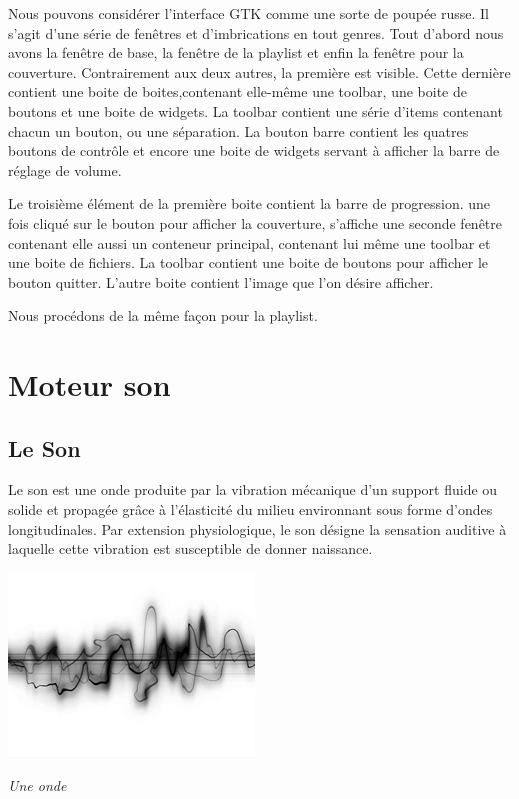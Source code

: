 \documentclass[12pt,a4paper]{report}
\begin{document}
Nous pouvons considérer l'interface GTK comme une sorte de poupée russe. Il s'agit d'une série de fenêtres et d'imbrications en tout genres.
Tout d'abord nous avons la fenêtre de base, la fenêtre de la playlist et enfin la fenêtre pour la couverture. Contrairement aux deux autres, la première est visible.
Cette dernière contient une boite de boites,contenant elle-même une toolbar, une boite de boutons et une boite de widgets. La toolbar contient une série d'items contenant chacun un bouton, ou une séparation.
La bouton barre contient les quatres boutons de contrôle et encore une boite de widgets servant à afficher la barre de réglage de volume.

Le troisième élément de la première boite contient la barre de progression.
une fois cliqué sur le bouton pour afficher la couverture, s'affiche une seconde fenêtre contenant elle aussi un conteneur principal, contenant lui même une toolbar et une boite de fichiers. La toolbar contient une boite de boutons pour afficher le bouton quitter. L'autre boite contient l'image que l'on désire afficher.

Nous procédons de la même façon pour la playlist.


\chapter{Moteur son}
\section{Le Son}


Le son est une onde produite par la vibration mécanique d'un support fluide ou solide et propagée grâce à l'élasticité du milieu environnant sous forme d'ondes longitudinales. Par extension physiologique, le son désigne la sensation auditive à laquelle cette vibration est susceptible de donner naissance.\\
\begin{center}

\includegraphics[scale=0.7]{onde.jpg}

\it{Une onde}
\end{center}
\end{document}
